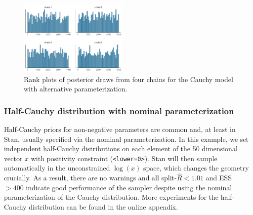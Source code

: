 \documentclass[american,]{article}
\theoremstyle{definition}
\begin{document}
\begin{figure}[tp]
  \centering
  \includegraphics[width=0.47\textwidth]{graphics/hist-fit-alt1-1.pdf}
  \caption{Rank plots of posterior draws from four chains for the Cauchy model with alternative parameterization.}
  \label{fig:hist-fit-alt1-1}
\end{figure}

\hypertarget{half-cauchy-distribution-with-nominal-parameterization}{%
\subsubsection*{Half-Cauchy distribution with nominal
parameterization}\label{half-cauchy-distribution-with-nominal-parameterization}}

Half-Cauchy priors for non-negative parameters are common and, at least in Stan, 
usually specified via the nominal parameterization.
In this example, we set independent half-Cauchy distributions on each element
of the 50 dimensional vector $x$ with positivity constraint
(\texttt{\textless{}lower=0\textgreater{}}). Stan will then
sample automatically in the unconstrained \(\log(x)\) space, which
changes the geometry crucially. As a result, there are no warnings and all
split-\(\widehat{R}<1.01\) and ESS \(>400\) indicate good
performance of the sampler despite using the nominal parameterization of
the Cauchy distribution. More experiments for the half-Cauchy distribution 
can be found in the online appendix.


\end{document}
